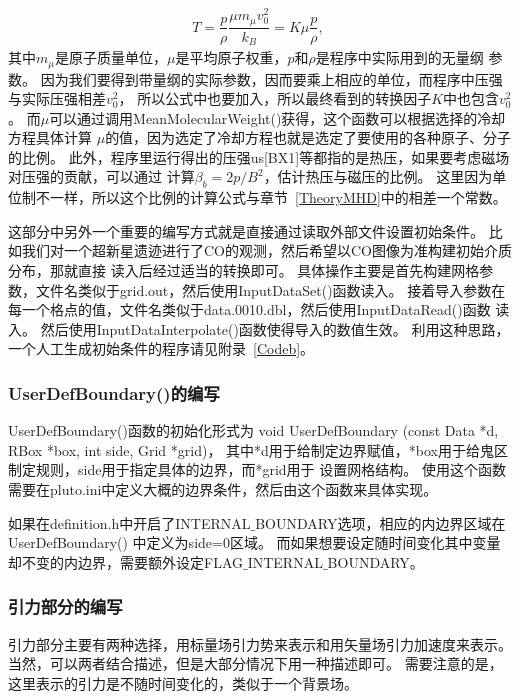\begin{equation}
  \begin{aligned}
    T = \dfrac{p}{\rho}\dfrac{\mu m_{\mu}v_0^2}{k_B}=K\mu\dfrac{p}{\rho} ,   \
  \end{aligned}
\end{equation}
其中$m_{\mu}$是原子质量单位，$\mu$是平均原子权重，$p$和$\rho$是程序中实际用到的无量纲
参数。
因为我们要得到带量纲的实际参数，因而要乘上相应的单位，而程序中压强与实际压强相差$v_0^2$，
所以公式中也要加入，所以最终看到的转换因子$K$中也包含$v_0^2$。
而$\mu$可以通过调用MeanMolecularWeight()获得，这个函数可以根据选择的冷却方程具体计算
$\mu$的值，因为选定了冷却方程也就是选定了要使用的各种原子、分子的比例。
此外，程序里运行得出的压强us[BX1]等都指的是热压，如果要考虑磁场对压强的贡献，可以通过
计算$\beta_b=2p/B^2$，估计热压与磁压的比例。
这里因为单位制不一样，所以这个比例的计算公式与章节~\ref{TheoryMHD}中的相差一个常数。

这部分中另外一个重要的编写方式就是直接通过读取外部文件设置初始条件。
比如我们对一个超新星遗迹进行了CO的观测，然后希望以CO图像为准构建初始介质分布，那就直接
读入后经过适当的转换即可。
具体操作主要是首先构建网格参数，文件名类似于grid.out，然后使用InputDataSet()函数读入。
接着导入参数在每一个格点的值，文件名类似于data.0010.dbl，然后使用InputDataRead()函数
读入。
然后使用InputDataInterpolate()函数使得导入的数值生效。
利用这种思路，一个人工生成初始条件的程序请见附录~\ref{Codeb}。

\subsubsection{UserDefBoundary()的编写}
UserDefBoundary()函数的初始化形式为
void UserDefBoundary (const Data *d, RBox *box, int side, Grid *grid)，
其中*d用于给制定边界赋值，*box用于给鬼区制定规则，side用于指定具体的边界，而*grid用于
设置网格结构。
使用这个函数需要在pluto.ini中定义大概的边界条件，然后由这个函数来具体实现。

如果在definition.h中开启了INTERNAL$\_$BOUNDARY选项，相应的内边界区域在UserDefBoundary()
中定义为side=0区域。
而如果想要设定随时间变化其中变量却不变的内边界，需要额外设定FLAG$\_$INTERNAL$\_$BOUNDARY。

\subsubsection{引力部分的编写}
引力部分主要有两种选择，用标量场引力势来表示和用矢量场引力加速度来表示。
当然，可以两者结合描述，但是大部分情况下用一种描述即可。
需要注意的是，这里表示的引力是不随时间变化的，类似于一个背景场。

